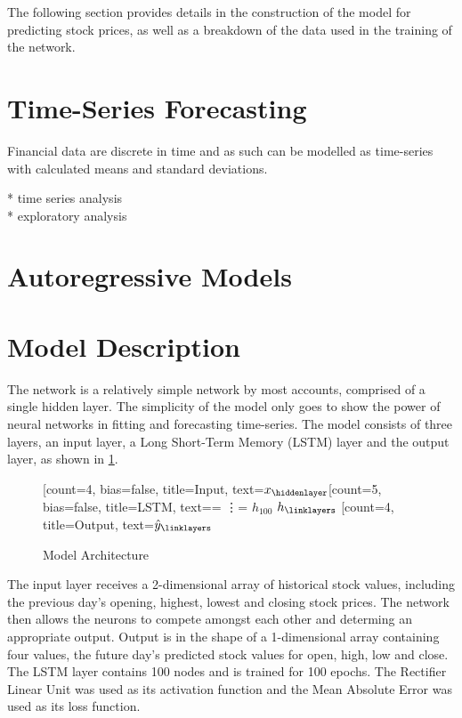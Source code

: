 The following section provides details in the construction of the model for predicting stock prices, as well as a breakdown of the data used in the training of the network.

\section{Time-Series Forecasting}
Financial data are discrete in time and as such can be modelled as time-series with calculated means and standard deviations.

* time series analysis\\
* exploratory analysis
\section{Autoregressive Models}

\section{Model Description}
The network is a relatively simple network by most accounts, comprised of a single hidden layer. The simplicity of the model only goes to show the power of neural networks in fitting and forecasting time-series. The model consists of three layers, an input layer, a Long Short-Term Memory (LSTM) layer and the output layer, as shown in \ref{tab:model_arch}.

\begin{figure}[h]
    \centering
    \begin{neuralnetwork}[height=4]
        \newcommand{\x}[2]{$x_#2$}
        \newcommand{\y}[2]{$\hat{y}_#2$}
        \newcommand{\h}[2]{$h_#2$}
        \newcommand{\hlast}[2]{\ifnum4=#2 \vdots \else \ifnum5=#2 $h_{100}$ \else $h_#2$ \fi \fi}
        [count=4, bias=false, title=Input, text=\x]
        \hiddenlayer[count=5, bias=false, title=LSTM, text=\hlast] \linklayers
        \outputlayer[count=4, title=Output, text=\y] 
        \linklayers
    \end{neuralnetwork}
    \caption{Model Architecture}
    \label{tab:model_arch}
\end{figure}

The input layer receives a 2-dimensional array of historical stock values, including the previous day's opening, highest, lowest and closing stock prices. The network then allows the neurons to compete amongst each other and determing an appropriate output. Output is in the shape of a 1-dimensional array containing four values, the future day's predicted stock values for open, high, low and close. The LSTM layer contains 100 nodes and is trained for 100 epochs. The Rectifier Linear Unit was used as its activation function and the Mean Absolute Error was used as its loss function.

